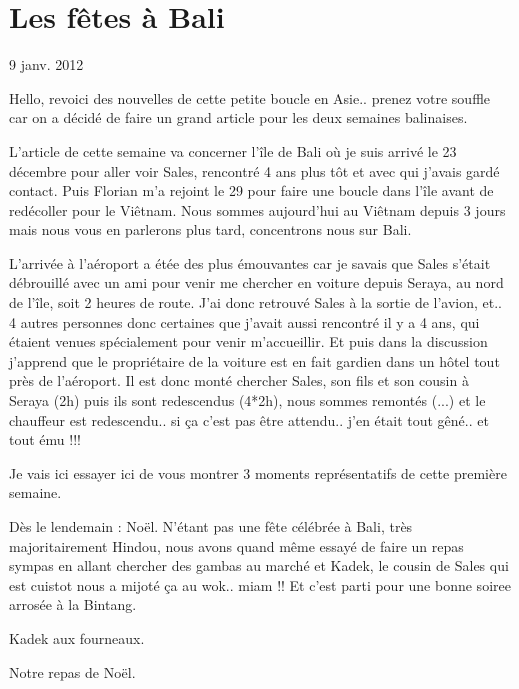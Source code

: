 \section{Les fêtes à Bali}

9 janv. 2012

\begin{multicols}{2}

Hello, revoici des nouvelles de cette petite boucle en Asie.. prenez votre souffle car on a décidé de faire un grand article pour les deux semaines balinaises.

L'article de cette semaine va concerner l'île de Bali où je suis arrivé le 23 décembre pour aller voir Sales, rencontré 4 ans plus tôt et avec qui j'avais gardé contact. Puis Florian m'a rejoint le 29 pour faire une boucle dans l'île avant de redécoller pour le Viêtnam. Nous sommes aujourd'hui au Viêtnam depuis 3 jours mais nous vous en parlerons plus tard, concentrons nous sur Bali.

L'arrivée à l'aéroport a étée des plus émouvantes car je savais que Sales s'était débrouillé avec un ami pour venir me chercher en voiture depuis Seraya, au nord de l'île, soit 2 heures de route. J'ai donc retrouvé Sales à la sortie de l'avion, et.. 4 autres personnes donc certaines que j'avait aussi rencontré il y a 4 ans, qui étaient venues spécialement pour venir m'accueillir. Et puis dans la discussion j'apprend que le propriétaire de la voiture est en fait gardien dans un hôtel tout près de l'aéroport. Il est donc monté chercher Sales, son fils et son cousin à Seraya (2h) puis ils sont redescendus (4*2h), nous sommes remontés (...) et le chauffeur est redescendu.. si ça c'est pas être attendu.. j'en était tout gêné.. et tout ému !!!

Je vais ici essayer ici de vous montrer 3 moments représentatifs de cette première semaine.

Dès le lendemain : Noël. N'étant pas une fête célébrée à Bali, très majoritairement Hindou, nous avons quand même essayé de faire un repas sympas en allant chercher des gambas au marché et Kadek, le cousin de Sales qui est cuistot nous a mijoté ça au wok.. miam !! Et c'est parti pour une bonne soiree arrosée à la Bintang.

Kadek aux fourneaux.


Notre repas de Noël.


\end{multicols}
